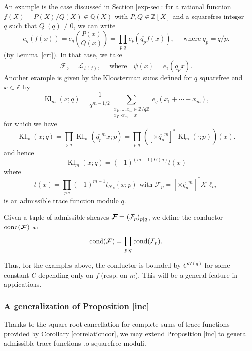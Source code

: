 \documentclass[12pt,a4paper,reqno]{amsart}
\numberwithin{equation}{section}
\DeclareMathOperator*\cond{cond}
\DeclareMathOperator{\hypk}{Kl}
\newcommand{\Kl}{\mathcal{K}\ell}
\theoremstyle{plain}
\theoremstyle{definition}
\newcommand\Z{\mathbb{Z}}
\newcommand\Q{\mathbb{Q}}
\newcommand{\uple}[1]{\text{\boldmath${#1}$}}
\newcommand\ov{\overline}
\newcommand\mcF{\mathcal{F}}
\newcommand\mcL{\mathcal{L}}
\newcommand\Zz{\mathbb{Z}}
\renewcommand{\lessapprox}{\llcurly}
\begin{document}
An example is the case discussed in Section \ref{exp-sec}: for a
rational function $f(X)=P(X)/Q(X)\in\Q(X)$ with $P,Q\in\Zz[X]$ and a
squarefree integer $q$ such that $Q\ (q)\neq 0$, we can write 
$$
e_q(f(x))=e_q\left(\frac{P(x)}{Q(x)}\right)=
\prod_{p|q}e_p\left(\ov{q_p}f(x)\right),\quad\text{ where } q_p=q/p.
$$ 
(by Lemma~\ref{crt}). In that case, we take
$$
\mcF_p=\mcL_{\psi(f)},\quad\text{ where}\quad \psi(x)=e_p(\ov{q_p}x).
$$
Another example is given by the Kloosterman sums defined for $q$
squarefree and $x\in\Z$ by
\begin{equation}\label{kl-def}
  \hypk_m(x;q)=\frac{1}{q^{{m-1}/2}}
  \sum_{\substack{x_1,\ldots,x_m\in \Z/q\Z\\x_1\cdots x_m=x}}e_q(x_1+\cdots+x_m),
\end{equation}
for which we have
$$
\hypk_m(x;q)=\prod_{p|q}\hypk_m(\ov{q_p}^mx;p) =\prod_{p|q}([\times
\ov{q_p}^m]^*\hypk_m(\cdot;p))(x).
$$ 
and hence
$$
\hypk_m(x;q)=(-1)^{(m-1)\Omega(q)}t(x)
$$
where
$$
t(x)=\prod_{p|q}(-1)^{m-1}t_{\mcF_p}(x;p)\text{ with }\mcF_p=[\times
\ov{q_p}^m]^*\Kl_m
$$
is an admissible trace function modulo $q$.

Given a tuple of admissible sheaves $\uple{\mcF}=(\mcF_p)_{p\mid q}$,
we define the conductor $\cond(\uple{\mcF})$ as
$$
\cond(\uple{\mcF})=\prod_{p\mid q}\cond(\mcF_p).
$$

Thus, for the examples above, the conductor is bounded by
$C^{\Omega(q)}$ for some constant $C$ depending only on $f$ (resp. on
$m$). This will be a general feature in applications.


\subsubsection{A generalization of Proposition \ref{inc}}\label{ssec-vdc}

Thanks to the square root cancellation for complete sums of trace
functions provided by Corollary \ref{correlationcor}, we may extend
Proposition \ref{inc} to general admissible trace functions to
squarefree moduli.
\end{document}
